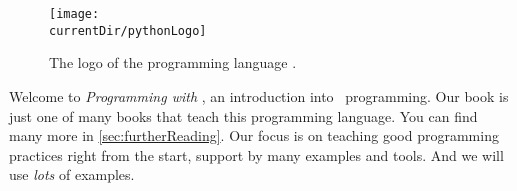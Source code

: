 \hsection{}%
%
%
\begin{figure}%
\centering%
\texttt{[image: \\currentDir/pythonLogo]}%
\caption{The logo of the programming language \python.}%
\label{fig:pythonLogo}%
\end{figure}%
%
Welcome to \emph{Programming with \python}, an introduction into \python\ programming.
Our book is just one of many books that teach this programming language.
You can find many more in \cref{sec:furtherReading}.
Our focus is on teaching good programming practices right from the start, support by many examples and tools.
And we will use \emph{lots} of examples.
%
%
%
%
%
\endhsection\endhsection%
%
